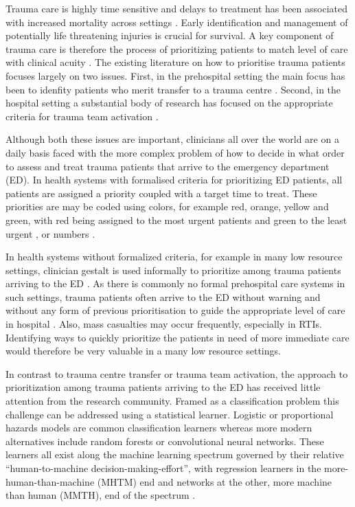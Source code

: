 \documentclass[10pt,letterpaper]{article}\usepackage[]{graphicx}\usepackage[]{color}
\begin{document}
Trauma care is highly time sensitive and delays to treatment has been associated
with increased mortality across settings
\cite{Yeboah2014,OReilly2013,Roy2017a}. Early identification and management of
potentially life threatening injuries is crucial for survival. A key component
of trauma care is therefore the process of prioritizing patients to match level
of care with clinical acuity \cite{EAST2010,NICE2016}. The existing literature
on how to prioritise trauma patients focuses largely on two issues. First, in
the prehospital setting the main focus has been to idenfity patients who merit
transfer to a trauma centre \cite{Voskens2018}. Second, in the hospital setting
a substantial body of research has focused on the appropriate criteria for
trauma team activation \cite{VanRein2018,Tignanelli2018}.

Although both these issues are important, clinicians all over the world are on a
daily basis faced with the more complex problem of how to decide in what order
to assess and treat trauma patients that arrive to the emergency department
(ED). In health systems with formalised criteria for prioritizing ED patients,
all patients are assigned a priority coupled with a target time to treat. These
priorities are may be coded using colors, for example red, orange,
yellow and green, with red being assigned to the most urgent patients and green
to the least urgent \cite{SATG2012}, or numbers \cite{ESI2012}.

In health systems without formalized criteria, for example in many low resource
settings, clinician gestalt is used informally to prioritize among trauma
patients arriving to the ED \cite{Baker2013}. As there is commonly no formal
prehospital care systems in such settings, trauma patients often arrive to the
ED without warning and without any form of previous prioritisation to guide the
appropriate level of care in hospital \cite{Choi2017}. Also, mass casualties may
occur frequently, especially in RTIs. Identifying ways to quickly prioritize the
patients in need of more immediate care would therefore be very valuable in a
many low resource settings.

In contrast to trauma centre transfer or trauma team activation, the approach to
prioritization among trauma patients arriving to the ED has received little
attention from the research community. Framed as a classification problem this
challenge can be addressed using a statistical learner. Logistic or proportional
hazards models are common classification learners whereas more modern
alternatives include random forests or convolutional neural networks. These
learners all exist along the machine learning spectrum governed by their
relative ``human-to-machine decision-making-effort'', with regression learners
in the more-human-than-machine (MHTM) end and networks at the other, more
machine than human (MMTH), end of the spectrum \cite{Beam2018}.
\end{document}
